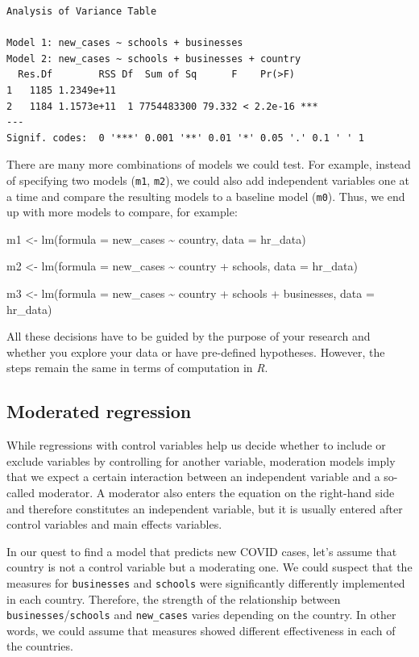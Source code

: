 \documentclass[
  letterpaper,
]{krantz}
\begin{document}
\begin{verbatim}
Analysis of Variance Table

Model 1: new_cases ~ schools + businesses
Model 2: new_cases ~ schools + businesses + country
  Res.Df        RSS Df  Sum of Sq      F    Pr(>F)    
1   1185 1.2349e+11                                   
2   1184 1.1573e+11  1 7754483300 79.332 < 2.2e-16 ***
---
Signif. codes:  0 '***' 0.001 '**' 0.01 '*' 0.05 '.' 0.1 ' ' 1
\end{verbatim}

There are many more combinations of models we could test. For example,
instead of specifying two models (\texttt{m1}, \texttt{m2}), we could
also add independent variables one at a time and compare the resulting
models to a baseline model (\texttt{m0}). Thus, we end up with more
models to compare, for example:

\label{four-hierarchical-regressions-nested}
m1 \textless- lm(formula = new\_cases \textasciitilde{} country, data =
hr\_data)

m2 \textless- lm(formula = new\_cases \textasciitilde{} country +
schools, data = hr\_data)

m3 \textless- lm(formula = new\_cases \textasciitilde{} country +
schools + businesses, data = hr\_data)

All these decisions have to be guided by the purpose of your research
and whether you explore your data or have pre-defined hypotheses.
However, the steps remain the same in terms of computation in \emph{R}.

\subsection{Moderated regression}\label{sec-moderated-regression}

While regressions with control variables help us decide whether to
include or exclude variables by controlling for another variable,
moderation models imply that we expect a certain interaction between an
independent variable and a so-called moderator. A moderator also enters
the equation on the right-hand side and therefore constitutes an
independent variable, but it is usually entered after control variables
and main effects variables.

In our quest to find a model that predicts new COVID cases, let's assume
that country is not a control variable but a moderating one. We could
suspect that the measures for \texttt{businesses} and \texttt{schools}
were significantly differently implemented in each country. Therefore,
the strength of the relationship between
\texttt{businesses}/\texttt{schools} and \texttt{new\_cases} varies
depending on the country. In other words, we could assume that measures
showed different effectiveness in each of the countries.
\end{document}
